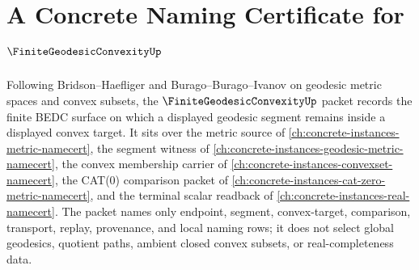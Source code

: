 \chapter{A Concrete Naming Certificate for $\FiniteGeodesicConvexityUp$}
\label{ch:concrete-instances-finite-geodesic-convexity-namecert}

Following Bridson--Haefliger and Burago--Burago--Ivanov on geodesic metric spaces and convex subsets, the $\FiniteGeodesicConvexityUp$ packet records the finite BEDC surface on which a displayed geodesic segment remains inside a displayed convex target. It sits over the metric source of \autoref{ch:concrete-instances-metric-namecert}, the segment witness of \autoref{ch:concrete-instances-geodesic-metric-namecert}, the convex membership carrier of \autoref{ch:concrete-instances-convexset-namecert}, the CAT(0) comparison packet of \autoref{ch:concrete-instances-cat-zero-metric-namecert}, and the terminal scalar readback of \autoref{ch:concrete-instances-real-namecert}. The packet names only endpoint, segment, convex-target, comparison, transport, replay, provenance, and local naming rows; it does not select global geodesics, quotient paths, ambient closed convex subsets, or real-completeness data.

